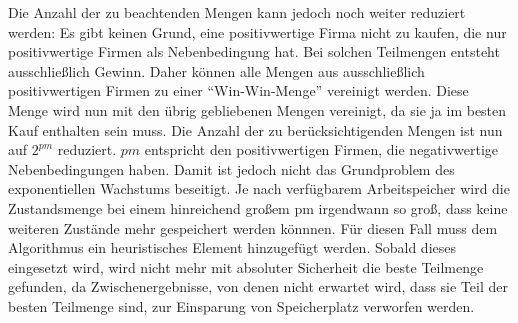Die Anzahl der zu beachtenden Mengen kann jedoch noch weiter reduziert werden: Es gibt keinen Grund, eine positivwertige Firma nicht zu kaufen, die nur positivwertige Firmen als Nebenbedingung hat. Bei solchen Teilmengen entsteht ausschließlich Gewinn. Daher können alle Mengen aus ausschließlich positivwertigen Firmen zu einer "`Win-Win-Menge"' vereinigt werden. Diese Menge wird nun mit den übrig gebliebenen Mengen vereinigt, da sie ja im besten Kauf enthalten sein muss. Die Anzahl der zu berücksichtigenden Mengen ist nun auf \(2^{pm}\) reduziert. \(pm\) entspricht den positivwertigen Firmen, die negativwertige Nebenbedingungen haben.
Damit ist jedoch nicht das Grundproblem des exponentiellen Wachstums beseitigt. Je nach verfügbarem Arbeitspeicher wird die Zustandsmenge bei einem hinreichend großem pm irgendwann so groß, dass keine weiteren Zustände mehr gespeichert werden könnnen.
Für diesen Fall muss dem Algorithmus ein heuristisches Element hinzugefügt werden. Sobald dieses eingesetzt wird, wird nicht mehr mit absoluter Sicherheit die beste Teilmenge gefunden, da Zwischenergebnisse, von denen nicht erwartet wird, dass sie Teil der besten Teilmenge sind, zur Einsparung von Speicherplatz verworfen werden.